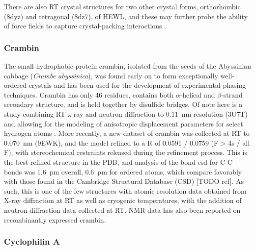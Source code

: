 \documentclass[9pt,review]{livecoms}
\begin{document}
There are also RT crystal structures for two other crystal forms, orthorhombic (8dyz) and tetragonal (8dz7), of HEWL, and these may further probe the ability of force fields to capture crystal-packing interactions \cite{meisburger_robust_2023}.

\subsubsection{Crambin}
\label{sub2:crambin}

The small hydrophobic protein crambin, isolated from the seeds of the Abyssinian cabbage (\textit{Crambe abyssinica}), was found early on to form exceptionally well-ordered crystals \cite{teeter_water_1984} and has been used for the development of experimental phasing techniques.
Crambin has only 46 residues, contains both $\alpha$-helical and $\beta$-strand secondary structure, and is held together by disulfide bridges.
Of note here is a study combining RT x-ray and neutron diffraction to \qty{0.11}{\nano\meter} resolution (3U7T) and allowing for the modeling of anisotropic displacement parameters for select hydrogen atoms \cite{chen_room-temperature_2012}.
More recently, a new dataset of crambin was collected at RT to \qty{0.070}{\nano\meter} (9EWK), and the model refined to a R of 0.0591 / 0.0759 (F > 4s / all F), with stereochemical restraints released during the refinement process.
This is the best refined structure in the PDB, and analysis of the bond esd for C-C bonds was \qty{1.6}{\pico\meter} overall, \qty{0.6}{\pico\meter} for ordered atoms, which compare favorably with those found in the Cambridge Structural Database (CSD) [TODO ref].
As such, this is one of the few structures with atomic resolution data obtained from X-ray diffraction at RT as well as cryogenic temperatures, with the addition of neutron diffraction data collected at RT.
NMR data has also been reported on recombinantly expressed crambin.

\subsubsection{Cyclophilin A}
\label{sub2:cypa}
\end{document}
